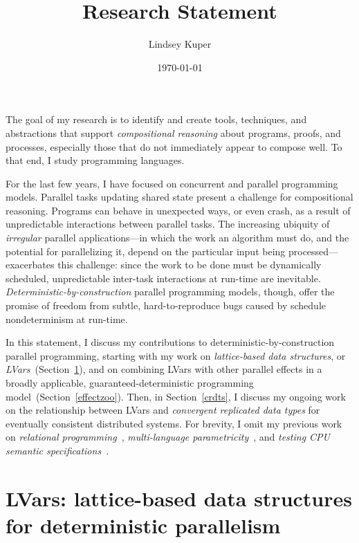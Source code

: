 \documentclass{article}
\def\name{Lindsey Kuper}
\begin{document}
\title{Research Statement}

\author{\name}

\date{\today}

\maketitle

\noindent 
The goal of my research is to identify and create tools, techniques,
and abstractions that support \emph{compositional reasoning} about
programs, proofs, and processes, especially those that do not
immediately appear to compose well.  To that end, I study programming
languages.

For the last few years, I have focused on concurrent and parallel
programming models.  Parallel tasks updating shared state present a
challenge for compositional reasoning. Programs can behave in
unexpected ways, or even crash, as a result of unpredictable
interactions between parallel tasks.  The increasing ubiquity of
\emph{irregular} parallel applications---in which the work an
algorithm must do, and the potential for parallelizing it, depend on
the particular input being processed---exacerbates this challenge:
since the work to be done must be dynamically scheduled, unpredictable
inter-task interactions at run-time are inevitable.
\emph{Deterministic-by-construction} parallel programming models,
though, offer the promise of freedom from subtle, hard-to-reproduce
bugs caused by schedule nondeterminism at run-time.

In this statement, I discuss my contributions to
deterministic-by-construction parallel programming, starting with my
work on \emph{lattice-based data structures}, or
\emph{LVars}~(Section~\ref{lvars}), and on combining LVars with other
parallel effects in a broadly applicable, guaranteed-deterministic
programming model~(Section~\ref{effectzoo}).  Then, in
Section~\ref{crdts}, I discuss my ongoing work on the relationship
between LVars and \emph{convergent replicated data types} for
eventually consistent distributed systems.  For brevity, I omit my
previous work on \emph{relational programming}~\cite{lambdae},
\emph{multi-language parametricity}~\cite{multilang-talk}, and
\emph{testing CPU semantic specifications}~\cite{tsl-tr}.

\section{LVars: lattice-based data structures for deterministic parallelism}\label{lvars}
\end{document}
